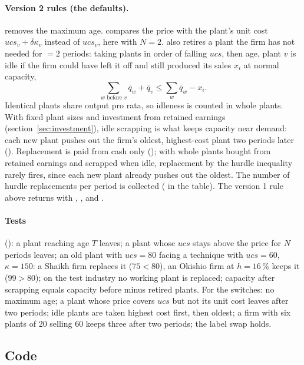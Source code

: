 \paragraph{Version 2 rules (the defaults).}  removes the maximum age.
 compares the price with the plant's unit cost
$ucs_v + \delta\kappa_v$ instead of $ucs_v$, here with $N = 2$. 
also retires a plant the firm has not needed for  $= 2$ periods: taking
plants in order of falling $ucs$, then age, plant $v$ is idle if the firm could have left it
off and still produced its sales $x_i$ at normal capacity,
\[
\textstyle\sum_{w \text{ before } v} \bar q_w + \bar q_v \le \sum_w \bar q_w - x_i .
\]
Identical plants share output pro rata, so idleness is counted in whole plants. With fixed
plant sizes and investment from retained earnings (section~\ref{sec:investment}), idle
scrapping is what keeps capacity near demand: each new plant pushes out the firm's oldest,
highest-cost plant two periods later (). Replacement is paid
from cash only (); with whole plants bought from retained earnings
and scrapped when idle, replacement by the hurdle inequality rarely fires, since each new
plant already pushes out the oldest. The number of hurdle replacements per period is
collected ( in the  table). The version 1 rule above
returns with , ,
 and .

\paragraph{Tests} (): a plant reaching age $T$ leaves; a plant
whose $ucs$ stays above the price for $N$ periods leaves; an old plant with $ucs = 80$
facing a technique with $ucs = 60$, $\kappa = 150$: a Shaikh firm replaces it
($75 < 80$), an Okishio firm at $h = 16\,\%$ keeps it ($99 > 80$); on the test industry no
working plant is replaced; capacity after scrapping equals capacity before minus retired
plants. For the switches: no maximum age; a plant whose price covers $ucs$ but not its unit
cost leaves after two periods; idle plants are taken highest cost first, then oldest; a
firm with six plants of 20 selling 60 keeps three after two periods; the label swap holds.

\subsection*{Code}

